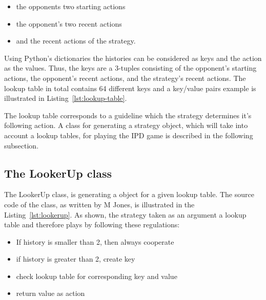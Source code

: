 \begin{itemize}
  \item the opponents two starting actions
  \item the opponent's two recent actions
  \item and the recent actions of the strategy.
\end{itemize}

Using Python's dictionaries the histories can be considered as keys and
the action as the values. Thus, the keys are a 3-tuples consisting of the opponent's
starting actions, the opponent's recent actions, and the strategy's recent actions.
The lookup table in total contains 64 different keys and a key/value pairs example
is illustrated in Listing~\ref{lst:lookup-table}.


The lookup table corresponds to a guideline which the strategy determines it's following action.
A class for generating a strategy object, which  will take into account a lookup tables,
for playing the IPD game is described in the following subsection.

\subsection{The LookerUp class}

The LookerUp class, is generating a object for a given lookup table.
The source code of the class, as written by M Jones, is illustrated in the
Listing~\ref{lst:lookerup}. As shown, the strategy taken as an argument
a lookup table and therefore plays by following these regulations:
\begin{itemize}
  \item If history is smaller than 2, then  always cooperate
  \item if history is greater than 2, create key
  \item check lookup table for corresponding key and value
  \item return value as action
\end{itemize}

